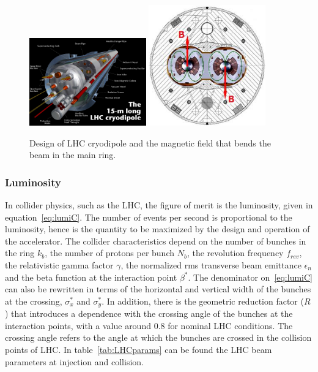 \begin{figure}[!Hhtbp]
  \begin{center}
    \includegraphics[width=0.45\textwidth]{figs/cryodipole.jpg}
    \includegraphics[width=0.45\textwidth]{figs/dipole_B.jpg}
    \caption{Design of LHC cryodipole and the magnetic field that bends the beam in the main ring.}
    \label{fig:dipole}
  \end{center}
\end{figure}

\subsubsection{Luminosity}
\label{sec:lumi}

In collider physics, such as the LHC, the figure of merit is the luminosity, given in equation~\ref{eq:lumiC}. The number of events per second is proportional to the luminosity, hence is the quantity to be maximized by the design and operation of the accelerator. The collider characteristics depend on the number of bunches in the ring $k_{b}$, the number of protons per bunch $N_{b}$, the revolution frequency $f_{rev}$, the relativistic gamma factor $\gamma$, the normalized rms transverse beam emittance $\epsilon_{n}$ and the beta function at the interaction point $\beta^{*}$. The denominator on~\ref{eq:lumiC} can also be rewritten in terms of the horizontal and vertical width of the bunches at the crossing, $\sigma^{*}_{x}$ and $\sigma^{*}_{y}$. In addition, there is the geometric reduction factor ($R$) that introduces a dependence with the crossing angle of the bunches at the interaction points, with a value around 0.8 for nominal LHC conditions. The crossing angle refers to the angle at which the bunches are crossed in the collision points of LHC. In table~\ref{tab:LHCparams} can be found the LHC beam parameters at injection and collision.  


